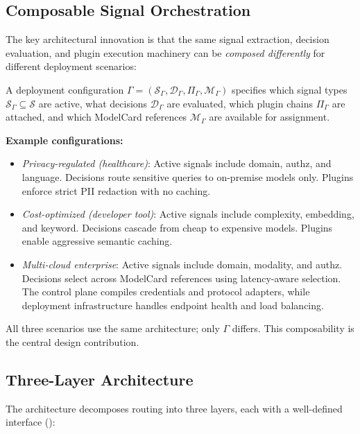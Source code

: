 \subsection{Composable Signal Orchestration}

The key architectural innovation is that the same signal extraction, decision evaluation, and plugin execution machinery can be \emph{composed differently} for different deployment scenarios:

\begin{definition}
A deployment configuration $\Gamma = (\mathcal{S}_\Gamma, \mathcal{D}_\Gamma, \Pi_\Gamma, \mathcal{M}_\Gamma)$ specifies which signal types $\mathcal{S}_\Gamma \subseteq \mathcal{S}$ are active, what decisions $\mathcal{D}_\Gamma$ are evaluated, which plugin chains $\Pi_\Gamma$ are attached, and which ModelCard references $\mathcal{M}_\Gamma$ are available for assignment.
\end{definition}

\noindent\textbf{Example configurations:}
\begin{itemize}[leftmargin=*]
  \item \emph{Privacy-regulated (healthcare)}: Active signals include domain, authz, and language. Decisions route sensitive queries to on-premise models only. Plugins enforce strict PII redaction with no caching.
  \item \emph{Cost-optimized (developer tool)}: Active signals include complexity, embedding, and keyword. Decisions cascade from cheap to expensive models. Plugins enable aggressive semantic caching.
  \item \emph{Multi-cloud enterprise}: Active signals include domain, modality, and authz. Decisions select across ModelCard references using latency-aware selection. The control plane compiles credentials and protocol adapters, while deployment infrastructure handles endpoint health and load balancing.
\end{itemize}

All three scenarios use the same architecture; only $\Gamma$ differs. This composability is the central design contribution.

\subsection{Three-Layer Architecture}

The architecture decomposes routing into three layers, each with a well-defined interface ():

